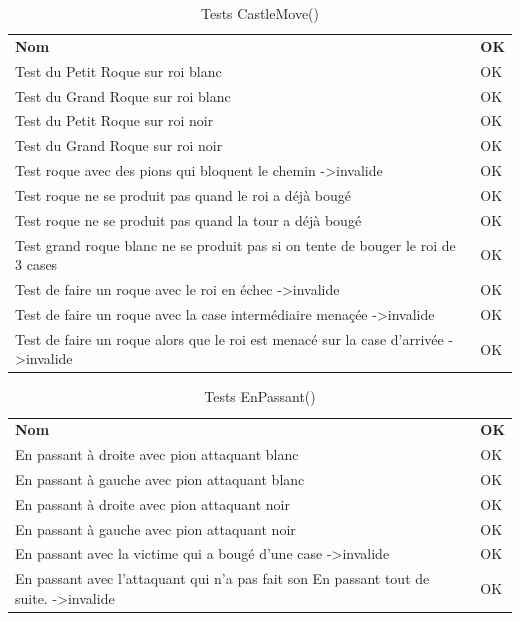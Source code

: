\documentclass[12pt]{article}
\begin{document}
\begin{table}[h!]
\caption{Tests CastleMove()}
\begin{tabular}{p{15cm}||p{2cm}}
\textbf{Nom}                                                                                    & \textbf{OK} \\
Test du Petit Roque sur roi blanc                                                               & OK \\
Test du Grand Roque sur roi blanc                                                               & OK \\
Test du Petit Roque sur roi noir                                                                & OK \\
Test du Grand Roque sur roi noir                                                                & OK \\
Test roque avec des pions qui bloquent le chemin -\textgreater invalide                         & OK \\
Test roque ne se produit pas quand le roi a déjà bougé                                          & OK \\
Test roque ne se produit pas quand la tour a déjà bougé                                         & OK \\
Test grand roque blanc ne se produit pas si on tente de bouger le roi de 3 cases                & OK \\
Test de faire un roque avec le roi en échec -\textgreater invalide                              & OK \\
Test de faire un roque avec la case intermédiaire menaçée -\textgreater invalide                & OK \\
Test de faire un roque alors que le roi est menacé sur la case d'arrivée -\textgreater invalide & OK
\end{tabular}
\end{table}

\begin{table}[h!]
\caption{Tests EnPassant()}
\begin{tabular}{p{15cm}||p{2cm}}
\textbf{Nom}                                                                                      & \textbf{OK }\\
En passant à droite avec pion attaquant blanc                                                     & OK \\
En passant à gauche avec pion attaquant blanc                                                     & OK \\
En passant à droite avec pion attaquant noir                                                      & OK \\
En passant à gauche avec pion attaquant noir                                                      & OK \\
En passant avec la victime qui a bougé d'une case -\textgreater invalide                          & OK \\
En passant avec l'attaquant qui n'a pas fait son En passant tout de suite. -\textgreater invalide & OK
\end{tabular}
\end{table}
\end{document}
